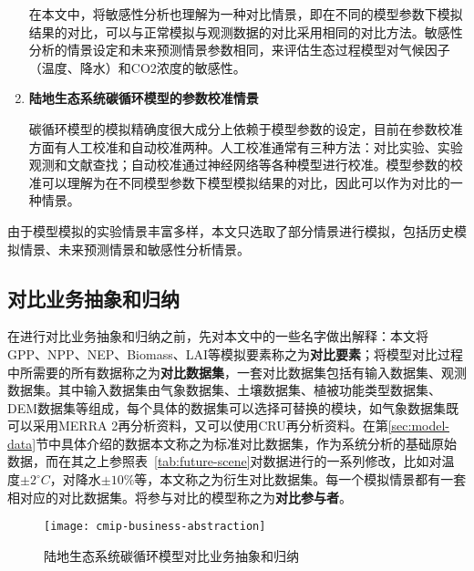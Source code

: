 \begin{enumerate}[(1)]
在本文中，将敏感性分析也理解为一种对比情景，即在不同的模型参数下模拟结果的对比，可以与正常模拟与观测数据的对比采用相同的对比方法。敏感性分析的情景设定和未来预测情景参数相同，来评估生态过程模型对气候因子（温度、降水）和CO2浓度的敏感性。

\item \textbf{陆地生态系统碳循环模型的参数校准情景}

碳循环模型的模拟精确度很大成分上依赖于模型参数的设定，目前在参数校准方面有人工校准和自动校准两种。人工校准通常有三种方法：对比实验、实验观测和文献查找；自动校准通过神经网络等各种模型进行校准。模型参数的校准可以理解为在不同模型参数下模型模拟结果的对比，因此可以作为对比的一种情景。

\end{enumerate}

由于模型模拟的实验情景丰富多样，本文只选取了部分情景进行模拟，包括历史模拟情景、未来预测情景和敏感性分析情景。

\subsection{对比业务抽象和归纳}

在进行对比业务抽象和归纳之前，先对本文中的一些名字做出解释：本文将GPP、NPP、NEP、Biomass、LAI等模拟要素称之为\textbf{对比要素}；将模型对比过程中所需要的所有数据称之为\textbf{对比数据集}，一套对比数据集包括有输入数据集、观测数据集。其中输入数据集由气象数据集、土壤数据集、植被功能类型数据集、DEM数据集等组成，每个具体的数据集可以选择可替换的模块，如气象数据集既可以采用MERRA 2再分析资料，又可以使用CRU再分析资料。在第\ref{sec:model-data}节中具体介绍的数据本文称之为标准对比数据集，作为系统分析的基础原始数据，而在其之上参照表~\ref{tab:future-scene}对数据进行的一系列修改，比如对温度$\pm2^{\circ}C$，对降水$\pm10\%$等，本文称之为衍生对比数据集。每一个模拟情景都有一套相对应的对比数据集。将参与对比的模型称之为\textbf{对比参与者}。

\begin{figure}[!htbp]
    \centering
    \texttt{[image: cmip-business-abstraction]}
    \caption{陆地生态系统碳循环模型对比业务抽象和归纳}
    \label{fig:cmip-business-abstraction}
\end{figure}

